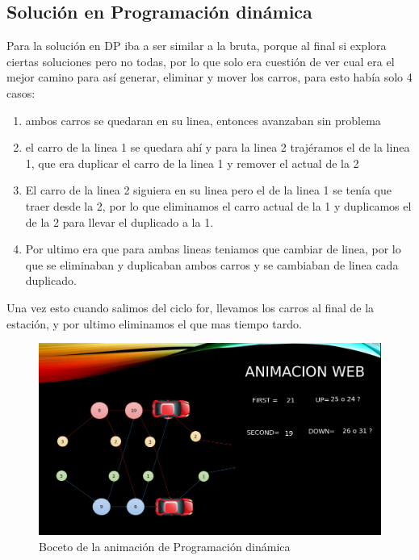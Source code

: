 \documentclass[12 pt]{report}
\begin{document}
\subsection{Solución en Programación dinámica}
Para la solución en DP iba a ser similar a la bruta, porque al final si explora ciertas soluciones pero no todas, por lo que solo era cuestión de ver cual era el mejor camino para así generar, eliminar y mover los carros, para esto había solo 4 casos:
\begin{enumerate}
\item ambos carros se quedaran en su linea, entonces avanzaban sin problema
\item el carro de la linea 1 se quedara ahí y para la linea 2 trajéramos el de la linea 1, que era duplicar el carro de la linea 1 y remover el actual de la 2
\item El carro de la linea 2 siguiera en su linea pero el de la linea 1 se tenía que traer desde la 2, por lo que eliminamos el carro actual de la 1 y duplicamos el de la 2 para llevar el duplicado a la 1.
\item Por ultimo era que para ambas lineas teniamos que cambiar de linea, por lo que se eliminaban y duplicaban ambos carros y se cambiaban de linea cada duplicado.
\end{enumerate}
Una vez esto cuando salimos del ciclo for, llevamos los carros al final de la estación, y por ultimo eliminamos el que mas tiempo tardo.
\begin{figure}[h!]
  \centering
  \includegraphics[scale = 0.3]{dpAnim}
  \caption{Boceto de la animación de Programación dinámica}
\end{figure}
\end{document}
